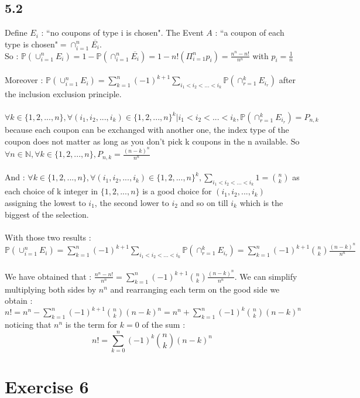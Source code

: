 \documentclass{article}
\begin{document}
\subsection*{5.2}
Define $E_i$ : ``no coupons of type i is chosen". The Event $A$ : ``a coupon of each type is chosen"$=\cap_{i=1}^n\overline{E_i}$.
\\
So : $\mathbb{P}(\cup_{i=1}^nE_i) = 1 - \mathbb{P}(\cap_{i=1}^n\overline{E_i}) =1- n!(\Pi_{i=1}^n p_i) = \frac{n^n-n!}{n^n}$ with $p_i = \frac{1}{n}$
\\\\
Moreover : $\mathbb{P}(\cup_{i=1}^nE_i) = \sum_{k=1}^n(-1)^{k+1}\sum_{i_1<i_2<...<i_k}\mathbb{P}(\cap_{r=1}^kE_{i_r})$ after the inclusion exclusion principle.
\\\\
$\forall k\in\{1,2,...,n\}, \forall(i_1,i_2,...,i_k)\in\{1,2,...,n\}^k | i_1<i_2<...<i_k, \mathbb{P}(\cap_{r=1}^kE_{i_r}) = P_{n,k}$
 because each coupon can be exchanged with another one, the index type of the coupon does not matter as long as you don't pick 
 k coupons in the n available. So $\forall n \in \mathbb{N}, \forall k\in\{1,2,...,n\}, P_{n,k} = \frac{(n-k)^n}{n^n}$
\\\\
And : 
$\forall k\in\{1,2,...,n\}, \forall(i_1,i_2,...,i_k)\in\{1,2,...,n\}^k, \sum_{i_1<i_2<...<i_k} 1 = \binom{n}{k}$ 
 as each choice of k integer in $\{1,2,...,n\}$ is a good choice for $(i_1,i_2,...,i_k)$ assigning the lowest to $i_1$, the second lower to $i_2$
 and so on till $i_k$ which is the biggest of the selection.
\\\\
With those two results : $\mathbb{P}(\cup_{i=1}^nE_i) = \sum_{k=1}^n(-1)^{k+1}\sum_{i_1<i_2<...<i_k}\mathbb{P}(\cap_{r=1}^kE_{i_r}) = \sum_{k=1}^n (-1)^{k+1}\binom{n}{k}\frac{(n-k)^n}{n^n}$
\\\\
We have obtained that : $\frac{n^n-n!}{n^n} = \sum_{k=1}^n (-1)^{k+1}\binom{n}{k}\frac{(n-k)^n}{n^n}$.
 We can simplify multiplying both sides by $n^n$ and rearranging each term on the good side we obtain :
 $n!= n^n-\sum_{k=1}^n (-1)^{k+1}\binom{n}{k}(n-k)^n = n^n+\sum_{k=1}^n (-1)^k\binom{n}{k}(n-k)^n$ noticing that $n^n$ is the term for $k=0$ of the sum :
 $$\boxed{n! = \sum_{k=0}^n(-1)^k\binom{n}{k}(n-k)^n}$$ 
\section*{Exercise 6}
\end{document}
